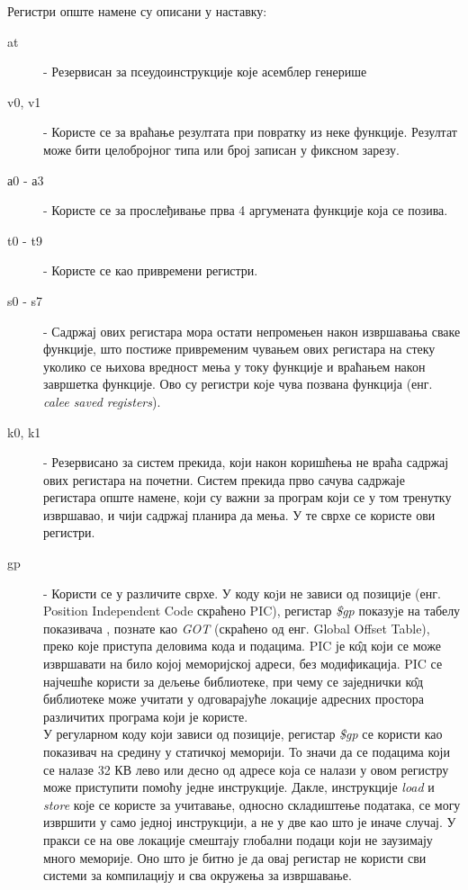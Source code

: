 \documentclass[12pt,oneside]{memoir}
\begin{document}
Регистри опште намене су описани у наставку:
\begin{description}
  \item[at] - Резервисан за псеудоинструкције које асемблер генерише
  \item[v0, v1] - Користе се за враћање резултата при повратку из неке функције. Резултат може бити целобројног типа или број записан у фиксном зарезу.
  \item[а0 - а3] - Користе се за прослеђивање прва 4 аргумената функције која се позива.
  \item[t0 - t9] - Користе се као привремени регистри. 
  \item[s0 - s7] - Садржај ових регистара мора остати непромењен након извршавања сваке функције, што постиже привременим чувањем ових регистара на стеку уколико се њихова вредност мења у току функције и враћањем након завршетка функције. Ово су регистри које чува позвана функција (енг. \textit{calee saved registers}).
  \item[k0, k1] - Резервисано за систем прекида, који након коришћења не враћа садржај ових регистара на почетни. Систем прекида прво сачува садржаје регистара опште намене, који су важни за програм који се у том тренутку извршавао, и чији садржај планира да мења. У те сврхе се користе ови регистри.
  \item[gp] - Користи се у различите сврхе. У коду коjи не зависи од позициjе (енг. Position Independent Code скраћено PIC), регистар \textit{\$gp} показуjе на табелу показивача , познате као \textit{GOT} (скраћено од енг. Global Offset Table), преко које приступа деловима кода и подацима. PIC је к\^{о}д који се може извршавати на било којој меморијској адреси, без модификација. PIC се најчешће користи за дељење библиотеке, при чему се заједнички к\^{о}д библиотеке може учитати у одговарајуће локације адресних простора различитих програма који је користе. \\
  У регуларном коду који зависи од позиције, регистар \textit{\$gp} се користи као показивач на средину у статичкој меморији. То значи да се подацима који се налазе 32 КВ лево или десно од адресе која се налази у овом регистру може приступити помоћу једне инструкције. Дакле, инструкције \textit{load} и \textit{store} које се користе за учитавање, односно складиштење података, се могу извршити у само једној инструкцији, а не у две као што је иначе случај. У пракси се на ове локације смештају глобални подаци који не заузимају много меморије. Оно што је битно је да овај регистар не користи сви системи за компилацију и сва окружења за извршавање.

\end{description}
\end{document}
